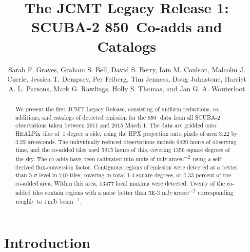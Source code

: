 \documentclass[twocolumn,times]{aastex6}
\newcommand{\um}{\micron}
\newcommand{\jyas}{Jy\,arcsec\textsuperscript{$-$2}}
\newcommand{\jybm}{Jy\,beam\textsuperscript{$-$1}}
\begin{document}
\title{The JCMT Legacy Release 1: SCUBA-2 850\micron\ Co-adds and Catalogs}

\author{Sarah F. Graves,
     Graham S. Bell,
     David S. Berry,
     Iain M. Coulson,
     Malcolm J. Currie,
     Jessica T. Dempsey,
     Per Friberg,
     Tim Jenness,
     Doug Johnstone,
     Harriet A. L. Parsons,
     Mark G. Rawlings,
     Holly S. Thomas,
    and Jan G. A. Wouterloot
}

\begin{abstract}
  We present the first JCMT Legacy Release, consisting of uniform
  reductions, co-additions, and catalogs of detected emission for the
  850\,\um\ data from all SCUBA-2 observations taken between 2011 and
  2015 March 1. The data are gridded onto HEALPix
  tiles of $~$1 degree a side, using the HPX projection onto pixels of
  area 3.22 by 3.22 arcseconds. The individually reduced observations
  include 6420 hours of observing time, and the co-added tiles used
  5915 hours of this, covering 1356 square degrees of
  the sky. The co-adds have been calibrated into units of m\jyas\ using
  a self-derived flux-conversion factor. Contiguous regions of
  emission were detected at a better than 5-$\sigma$ level in 740
  tiles, covering in total 1.4 square degrees, or 0.33 percent of the
  co-added area. Within this area, 13477 local maxima were
  detected. Twenty of the co-added tiles contain regions with a noise
  better than 5E-3 m\jyas\, corresponding roughly to 1\,m\jybm.
\end{abstract}


\section{Introduction}
\end{document}

